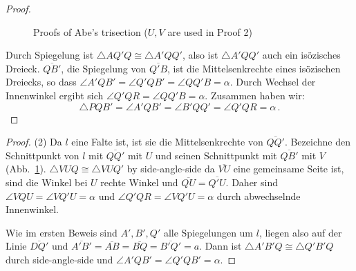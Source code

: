 \begin{proof}
\begin{figure}[ht]
\begin{center}
\end{center}
\caption{Proofs of Abe's trisection ($U,V$ are used in Proof 2)}\label{f.abe2}
\end{figure}

Durch Spiegelung ist $\triangle AQ'Q\cong \triangle A'QQ'$, also ist $\triangle A'QQ'$ auch ein isözisches Dreieck.
$\overline{QB'}$, die Spiegelung von $\overline{Q'B}$, ist die Mittelsenkrechte eines isözischen Dreiecks, so dass $\angle A'QB'=\angle Q'QB'=\angle QQ'B=\alpha$.
Durch Wechsel der Innenwinkel ergibt sich $\angle Q'QR=\angle QQ'B=\alpha$.
Zusammen haben wir:
\[
\triangle PQB'=\angle A'QB'=\angle B'QQ'=\angle Q'QR=\alpha\,.
\]
\end{proof}

\begin{proof} (2)
Da $l$ eine Falte ist, ist sie die Mittelsenkrechte von $\overline{QQ'}$. Bezeichne den Schnittpunkt von $l$ mit $\overline{QQ'}$ mit $U$ und seinen Schnittpunkt mit $\overline{QB'}$ mit $V$ (Abb.~\ref{f.abe2}). $\triangle VUQ\cong \triangle VUQ'$ by side-angle-side da $\overline{VU}$ eine gemeinsame Seite ist, sind die Winkel bei $U$ rechte Winkel und $\overline{QU}=\overline{Q'U}$. Daher sind $\angle VQU=\angle VQ'U=\alpha$ und $\angle Q'QR=\angle VQ'U=\alpha$ durch abwechselnde Innenwinkel.

Wie im ersten Beweis sind $A', B', Q'$ alle Spiegelungen um $l$, liegen also auf der Linie $\overline{DQ'}$ und $\overline{A'B'}=\overline{AB}=\overline{BQ}=\overline{B'Q'}=a$. Dann ist $\triangle A'B'Q\cong\triangle Q'B'Q$ durch side-angle-side und $\angle A'QB'=\angle Q'QB'=\alpha$.
\end{proof}

